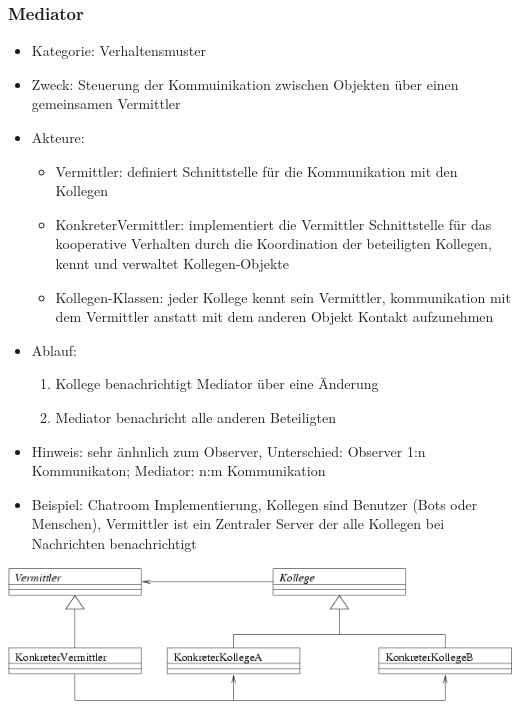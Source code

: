 \documentclass[11pt, fleqn, a4paper, leqno]{scrartcl} %
\begin{document}
		\subsubsection{Mediator}
			\begin{itemize}
				\item Kategorie: Verhaltensmuster
				\item Zweck: Steuerung der Kommuinikation zwischen Objekten über einen gemeinsamen Vermittler
				\item Akteure: 
					\begin{itemize}
						\item Vermittler: definiert Schnittstelle für die Kommunikation mit den Kollegen
						\item KonkreterVermittler: implementiert die Vermittler Schnittstelle für das kooperative Verhalten durch die Koordination der beteiligten Kollegen, kennt und verwaltet Kollegen-Objekte
						\item Kollegen-Klassen: jeder Kollege kennt sein Vermittler, kommunikation mit dem Vermittler anstatt mit dem anderen Objekt Kontakt aufzunehmen
					\end{itemize}
				\item Ablauf:
					\begin{enumerate}
						\item Kollege benachrichtigt Mediator über eine Änderung
						\item Mediator benachricht alle anderen Beteiligten
					\end{enumerate}
				\item Hinweis: sehr änhnlich zum Observer, Unterschied: Observer 1:n Kommunikaton; Mediator: n:m Kommunikation
				\item Beispiel: Chatroom Implementierung, Kollegen sind Benutzer (Bots oder Menschen), Vermittler ist ein Zentraler Server der alle Kollegen bei Nachrichten benachrichtigt			
			\end{itemize}
			\includegraphics{images/mediator.png}
			\newpage
\end{document}
